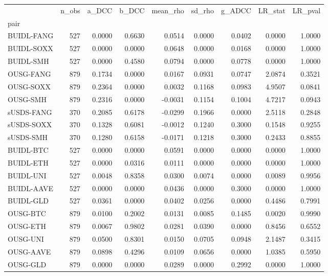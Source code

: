 \begin{tabular}{lrrrrrrrr}
\toprule
 & n\_obs & a\_DCC & b\_DCC & mean\_rho & sd\_rho & g\_ADCC & LR\_stat & LR\_pval \\
pair &  &  &  &  &  &  &  &  \\
\midrule
BUIDL-FANG & 527 & 0.0000 & 0.6630 & 0.0514 & 0.0000 & 0.0402 & 0.0000 & 1.0000 \\
BUIDL-SOXX & 527 & 0.0000 & 0.0000 & 0.0648 & 0.0000 & 0.0168 & 0.0000 & 1.0000 \\
BUIDL-SMH & 527 & 0.0000 & 0.4580 & 0.0794 & 0.0000 & 0.0778 & 0.0000 & 1.0000 \\
OUSG-FANG & 879 & 0.1734 & 0.0000 & 0.0167 & 0.0931 & 0.0747 & 2.0874 & 0.3521 \\
OUSG-SOXX & 879 & 0.2364 & 0.0000 & 0.0032 & 0.1168 & 0.0983 & 4.9507 & 0.0841 \\
OUSG-SMH & 879 & 0.2316 & 0.0000 & -0.0031 & 0.1154 & 0.1004 & 4.7217 & 0.0943 \\
sUSDS-FANG & 370 & 0.2085 & 0.6178 & -0.0299 & 0.1966 & 0.0000 & 2.5118 & 0.2848 \\
sUSDS-SOXX & 370 & 0.1328 & 0.6081 & -0.0012 & 0.1240 & 0.3000 & 0.1548 & 0.9255 \\
sUSDS-SMH & 370 & 0.1280 & 0.6158 & -0.0171 & 0.1218 & 0.3000 & 0.2433 & 0.8855 \\
BUIDL-BTC & 527 & 0.0000 & 0.0000 & 0.0591 & 0.0000 & 0.0000 & 0.0000 & 1.0000 \\
BUIDL-ETH & 527 & 0.0000 & 0.0316 & 0.0111 & 0.0000 & 0.0000 & 0.0000 & 1.0000 \\
BUIDL-UNI & 527 & 0.0048 & 0.8358 & 0.0300 & 0.0074 & 0.0000 & 0.0089 & 0.9956 \\
BUIDL-AAVE & 527 & 0.0000 & 0.0000 & 0.0436 & 0.0000 & 0.3000 & 0.0000 & 1.0000 \\
BUIDL-GLD & 527 & 0.0361 & 0.0000 & 0.0402 & 0.0256 & 0.0000 & 0.4486 & 0.7991 \\
OUSG-BTC & 879 & 0.0100 & 0.2002 & 0.0131 & 0.0085 & 0.1485 & 0.0020 & 0.9990 \\
OUSG-ETH & 879 & 0.0067 & 0.9802 & 0.0281 & 0.0390 & 0.0000 & 0.8456 & 0.6552 \\
OUSG-UNI & 879 & 0.0500 & 0.8301 & 0.0150 & 0.0705 & 0.0948 & 2.1487 & 0.3415 \\
OUSG-AAVE & 879 & 0.0898 & 0.4296 & 0.0109 & 0.0656 & 0.0000 & 1.0385 & 0.5950 \\
OUSG-GLD & 879 & 0.0000 & 0.0000 & 0.0289 & 0.0000 & 0.2992 & 0.0000 & 1.0000 \\

\end{tabular}
